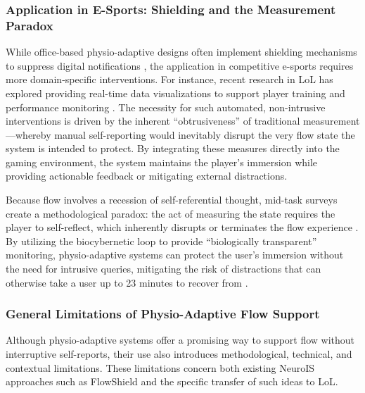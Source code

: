\subsubsection{Application in E-Sports: Shielding and the Measurement Paradox}
While office-based physio-adaptive designs often implement shielding mechanisms to suppress digital notifications \autocite{ubt_eref88160}, the application in competitive e-sports requires more domain-specific interventions. For instance, recent research in LoL has explored providing real-time data visualizations to support player training and performance monitoring \autocite{10.1145/3549506}. The necessity for such automated, non-intrusive interventions is driven by the inherent \enquote{obtrusiveness} of traditional measurement—whereby manual self-reporting would inevitably disrupt the very flow state the system is intended to protect. By integrating these measures directly into the gaming environment, the system maintains the player's immersion while providing actionable feedback or mitigating external distractions.

Because flow involves a recession of self-referential thought, mid-task surveys create a methodological paradox: the act of measuring the state requires the player to self-reflect, which inherently disrupts or terminates the flow experience \autocite{9296229, Moneta2012}. By utilizing the biocybernetic loop to provide \enquote{biologically transparent} monitoring, physio-adaptive systems can protect the user's immersion without the need for intrusive queries, mitigating the risk of distractions that can otherwise take a user up to 23 minutes to recover from \autocite{ubt_eref88160}.

\subsubsection{General Limitations of Physio-Adaptive Flow Support}
Although physio-adaptive systems offer a promising way to support flow without interruptive self-reports, their use also introduces methodological, technical, and contextual limitations. These limitations concern both existing NeuroIS approaches such as FlowShield and the specific transfer of such ideas to LoL.

